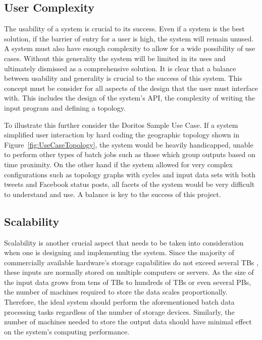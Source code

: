 \documentclass[a4paper]{article}
\begin{document}
\subsection{User Complexity}
The usability of a system is crucial to its success.  Even if a system is the best solution, if the barrier of entry for a user is high, the system will remain unused.  A system must also have enough complexity to allow for a wide possibility of use cases.  Without this generality the system will be limited in its uses and ultimately dismissed as a comprehensive solution.  It is clear that a balance between usability and generality is crucial to the success of this system.  This concept must be consider for all aspects of the design that the user must interface with.  This includes the design of the system's API, the complexity of writing the input program and defining a topology.  

To illustrate this further consider the Doritos Sample Use Case.  If a system simplified user interaction by hard coding the geographic topology shown in Figure~\ref{fig:UseCaseTopology}, the system would be heavily handicapped, unable to perform other types of batch jobs such as those which group outputs based on time proximity.  On the other hand if the system allowed for very complex configurations such as topology graphs with cycles and input data sets with both tweets and Facebook status posts, all facets of the system would be very difficult to understand and use.  A balance is key to the success of this project.

\subsection{Scalability}

Scalability is another crucial aspect that needs to be taken into consideration when one is designing and implementing the system. Since the majority of commercially available hardware's storage capabilities do not exceed several TBs \cite{Seagate 5TB HDD}, these inputs are normally stored on multiple computers or servers. As the size of the input data grows from tens of TBs to hundreds of TBs or even several PBs, the number of machines required to store the data scales proportionally. Therefore, the ideal system should perform the aforementioned batch data processing tasks regardless of the number of storage devices. Similarly, the number of machines needed to store the output data should have minimal effect on the system's computing performance.
\end{document}
